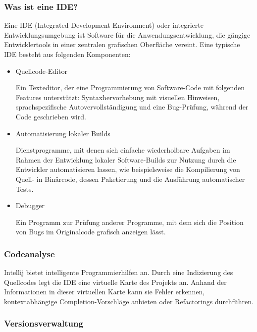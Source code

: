 \subsubsection{Was ist eine IDE?}

Eine IDE (Integrated Development Environment) oder integrierte Entwicklungsumgebung ist Software für die Anwendungsentwicklung, 
die gängige Entwicklertools in einer zentralen grafischen Oberfläche vereint. Eine typische IDE besteht aus folgenden Komponenten:
\cite{sysarch-intellij-2}

\begin{itemize}
    \item Quellcode-Editor
    
    Ein Texteditor, der eine Programmierung von Software-Code mit folgenden Features unterstützt: 
    Syntaxhervorhebung mit visuellen Hinweisen, sprachspezifische Autovervollständigung und eine Bug-Prüfung, während der Code geschrieben wird.
    \cite{sysarch-intellij-2}

    \item Automatisierung lokaler Builds
    
    Dienstprogramme, mit denen sich einfache wiederholbare Aufgaben im Rahmen der Entwicklung lokaler Software-Builds zur Nutzung durch 
    die Entwickler automatisieren lassen, wie beispielsweise die Kompilierung von Quell- in Binärcode, dessen Paketierung und die Ausführung automatischer Tests.
    \cite{sysarch-intellij-2}

    \item Debugger
    
    Ein Programm zur Prüfung anderer Programme, mit dem sich die Position von Bugs im Originalcode grafisch anzeigen lässt.
\cite{sysarch-intellij-2}
\end{itemize}

\subsubsection{Codeanalyse}

Intellij bietet intelligente Programmierhilfen an. Durch eine Indizierung des Quellcodes legt die IDE eine virtuelle 
Karte des Projekts an. Anhand der Informationen in dieser virtuellen Karte kann sie Fehler erkennen, kontextabhängige Completion-Vorschläge anbieten oder
Refactorings durchführen.
\cite{sysarch-intellij-1}


\subsubsection{Versionsverwaltung}

